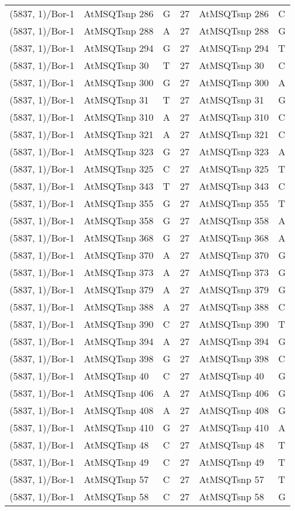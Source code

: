 \begin{center}
\begin{longtable}{|l|l|l|l|l|l|}
(5837, 1)/Bor-1&AtMSQTsnp 286&G&27&AtMSQTsnp 286&C\\
(5837, 1)/Bor-1&AtMSQTsnp 288&A&27&AtMSQTsnp 288&G\\
(5837, 1)/Bor-1&AtMSQTsnp 294&G&27&AtMSQTsnp 294&T\\
(5837, 1)/Bor-1&AtMSQTsnp 30&T&27&AtMSQTsnp 30&C\\
(5837, 1)/Bor-1&AtMSQTsnp 300&G&27&AtMSQTsnp 300&A\\
(5837, 1)/Bor-1&AtMSQTsnp 31&T&27&AtMSQTsnp 31&G\\
(5837, 1)/Bor-1&AtMSQTsnp 310&A&27&AtMSQTsnp 310&C\\
(5837, 1)/Bor-1&AtMSQTsnp 321&A&27&AtMSQTsnp 321&C\\
(5837, 1)/Bor-1&AtMSQTsnp 323&G&27&AtMSQTsnp 323&A\\
(5837, 1)/Bor-1&AtMSQTsnp 325&C&27&AtMSQTsnp 325&T\\
(5837, 1)/Bor-1&AtMSQTsnp 343&T&27&AtMSQTsnp 343&C\\
(5837, 1)/Bor-1&AtMSQTsnp 355&G&27&AtMSQTsnp 355&T\\
(5837, 1)/Bor-1&AtMSQTsnp 358&G&27&AtMSQTsnp 358&A\\
(5837, 1)/Bor-1&AtMSQTsnp 368&G&27&AtMSQTsnp 368&A\\
(5837, 1)/Bor-1&AtMSQTsnp 370&A&27&AtMSQTsnp 370&G\\
(5837, 1)/Bor-1&AtMSQTsnp 373&A&27&AtMSQTsnp 373&G\\
(5837, 1)/Bor-1&AtMSQTsnp 379&A&27&AtMSQTsnp 379&G\\
(5837, 1)/Bor-1&AtMSQTsnp 388&A&27&AtMSQTsnp 388&C\\
(5837, 1)/Bor-1&AtMSQTsnp 390&C&27&AtMSQTsnp 390&T\\
(5837, 1)/Bor-1&AtMSQTsnp 394&A&27&AtMSQTsnp 394&G\\
(5837, 1)/Bor-1&AtMSQTsnp 398&G&27&AtMSQTsnp 398&C\\
(5837, 1)/Bor-1&AtMSQTsnp 40&C&27&AtMSQTsnp 40&G\\
(5837, 1)/Bor-1&AtMSQTsnp 406&A&27&AtMSQTsnp 406&G\\
(5837, 1)/Bor-1&AtMSQTsnp 408&A&27&AtMSQTsnp 408&G\\
(5837, 1)/Bor-1&AtMSQTsnp 410&G&27&AtMSQTsnp 410&A\\
(5837, 1)/Bor-1&AtMSQTsnp 48&C&27&AtMSQTsnp 48&T\\
(5837, 1)/Bor-1&AtMSQTsnp 49&C&27&AtMSQTsnp 49&T\\
(5837, 1)/Bor-1&AtMSQTsnp 57&C&27&AtMSQTsnp 57&T\\
(5837, 1)/Bor-1&AtMSQTsnp 58&C&27&AtMSQTsnp 58&G\\

\end{longtable}
\end{center}
